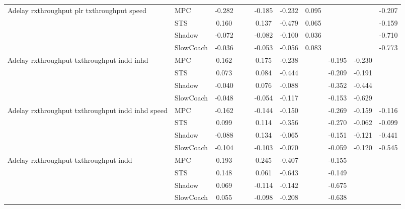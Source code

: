 \begin{tabular}{|l|l|*{9}{c|}}
\midrule
Adelay rxthroughput plr txthroughput speed    & MPC &   -0.282 &        &        & -0.185 & -0.232 &  0.095 &      &      &   -0.207 \\
                              & STS &    0.160 &        &        &  0.137 & -0.479 &  0.065 &      &      &   -0.159 \\
                              & Shadow &   -0.072 &        &        & -0.082 & -0.100 &  0.036 &      &      &   -0.710 \\
                              & SlowCoach &   -0.036 &        &        & -0.053 & -0.056 &  0.083 &      &      &   -0.773 \\
\midrule
Adelay rxthroughput txthroughput indd inhd    & MPC &    0.162 &        &        &  0.175 & -0.238 &     &  -0.195 &  -0.230 &       \\
                              & STS &    0.073 &        &        &  0.084 & -0.444 &     &  -0.209 &  -0.191 &       \\
                              & Shadow &   -0.040 &        &        &  0.076 & -0.088 &     &  -0.352 &  -0.444 &       \\
                              & SlowCoach &   -0.048 &        &        & -0.054 & -0.117 &     &  -0.153 &  -0.629 &       \\
\midrule
Adelay rxthroughput txthroughput indd inhd speed    & MPC &   -0.162 &        &        & -0.144 & -0.150 &     &  -0.269 &  -0.159 &   -0.116 \\
                              & STS &    0.099 &        &        &  0.114 & -0.356 &     &  -0.270 &  -0.062 &   -0.099 \\
                              & Shadow &   -0.088 &        &        &  0.134 & -0.065 &     &  -0.151 &  -0.121 &   -0.441 \\
                              & SlowCoach &   -0.104 &        &        & -0.103 & -0.070 &     &  -0.059 &  -0.120 &   -0.545 \\
\midrule
Adelay rxthroughput txthroughput indd    & MPC &    0.193 &        &        &  0.245 & -0.407 &     &  -0.155 &      &       \\
                              & STS &    0.148 &        &        &  0.061 & -0.643 &     &  -0.149 &      &       \\
                              & Shadow &    0.069 &        &        & -0.114 & -0.142 &     &  -0.675 &      &       \\
                              & SlowCoach &    0.055 &        &        & -0.098 & -0.208 &     &  -0.638 &      &       \\

\end{tabular}
